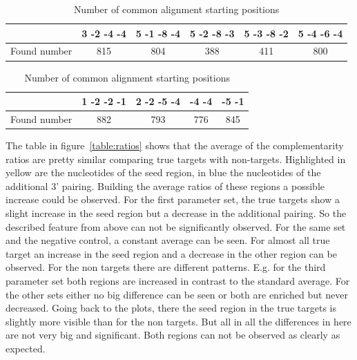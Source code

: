 \documentclass[12pt]{article}
\begin{document}
\begin{table}
\caption{Number of common alignment starting positions}
\vspace{0.3cm}
\begin{tabular}{c||c|c|c|c|c} 
& 3 -2 -4 -4 & 5 -1 -8 -4 & 5 -2 -8 -3 & 5 -3 -8 -2 & 5 -4 -6 -4  \\
\hline\hline
Found number & 815 & 804 & 388 & 411 & 800\\
\hline
\end{tabular}
\vspace{0.5cm}

\begin{tabular}{c||c|c|c|c}
& 1 -2 -2 -1 & 2 -2 -5 -4 & -4 -4 & -5 -1 \\
\hline\hline
Found number & 882 & 793 & 776 & 845  \\
\hline
\end{tabular}
\label{tab:positions}
\end{table}


The table in figure~\ref{table:ratios} shows that the average of the complementarity ratios are pretty similar comparing true targets with non-targets. Highlighted in yellow are the nucleotides of the seed region, in blue the nucleotides of the additional 3' pairing. Building the average ratios of these regions a possible increase could be observed. For the first parameter set, the true targets show a slight increase in the seed region but a decrease in the additional pairing. So the described feature from above can not be significantly observed. For the same set and the negative control, a constant average can be seen. For almost all true target an increase in the seed region and a decrease in the other region can be observed. For the non targets there are different patterns. E.g. for the third parameter set both regions are increased in contrast to the standard average. For the other sets either no big difference can be seen or both are enriched but never decreased. Going back to the plots, there the seed region in the true targets is slightly more visible than for the non targets. But all in all the differences in here are not very big and significant. Both regions can not be observed as clearly as expected.  
\end{document}
